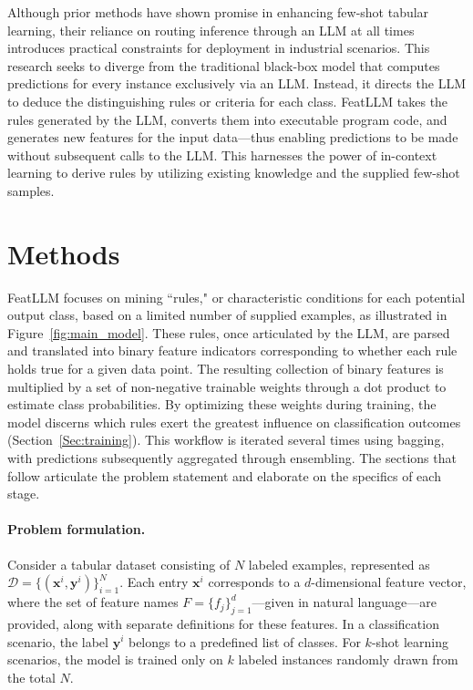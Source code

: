 Although prior methods have shown promise in enhancing few-shot tabular learning, their reliance on routing inference through an LLM at all times introduces practical constraints for deployment in industrial scenarios. This research seeks to diverge from the traditional black-box model that computes predictions for every instance exclusively via an LLM. Instead, it directs the LLM to deduce the distinguishing rules or criteria for each class. \textsf{FeatLLM} takes the rules generated by the LLM, converts them into executable program code, and generates new features for the input data—thus enabling predictions to be made without subsequent calls to the LLM. This harnesses the power of in-context learning to derive rules by utilizing existing knowledge and the supplied few-shot samples.

\section{Methods}
\textsf{FeatLLM} focuses on mining ``rules," or characteristic conditions for each potential output class, based on a limited number of supplied examples, as illustrated in Figure~\ref{fig:main_model}. These rules, once articulated by the LLM, are parsed and translated into binary feature indicators corresponding to whether each rule holds true for a given data point. The resulting collection of binary features is multiplied by a set of non-negative trainable weights through a dot product to estimate class probabilities. By optimizing these weights during training, the model discerns which rules exert the greatest influence on classification outcomes (Section~\ref{Sec:training}). This workflow is iterated several times using bagging, with predictions subsequently aggregated through ensembling. The sections that follow articulate the problem statement and elaborate on the specifics of each stage.

\vspace*{-0.12in}
\paragraph{Problem formulation.} Consider a tabular dataset consisting of $N$ labeled examples, represented as $\mathcal{D} = \{(\mathbf{x}^i, \mathbf{y}^i)\}_{i=1}^{N}$. Each entry $\mathbf{x}^i$ corresponds to a $d$-dimensional feature vector, where the set of feature names $F = \{f_j\}_{j=1}^{d}$—given in natural language—are provided, along with separate definitions for these features. In a classification scenario, the label $\mathbf{y}^i$ belongs to a predefined list of classes. For $k$-shot learning scenarios, the model is trained only on $k$ labeled instances randomly drawn from the total $N$.

